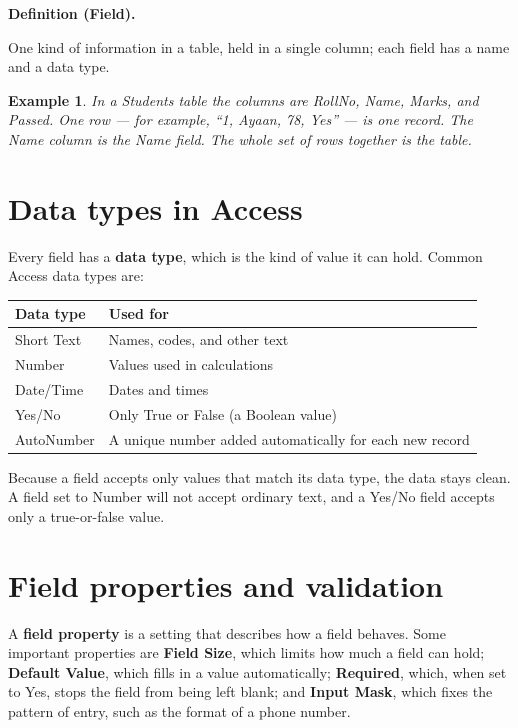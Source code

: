 \documentclass[11pt]{article}
\newtheorem{example}{Example}[section]
\newenvironment{definitionbox}[1]{%
  \par\noindent\textbf{Definition (#1).}\ \itshape
}{\par\vspace{0.3em}}
\begin{document}
\begin{definitionbox}{Field}
One kind of information in a table, held in a single column; each field has a
name and a data type.
\end{definitionbox}

\begin{example}
In a Students table the columns are RollNo, Name, Marks, and Passed. One row
--- for example, ``1, Ayaan, 78, Yes'' --- is one record. The Name column is
the Name field. The whole set of rows together is the table.
\end{example}

\section{Data types in Access}
Every field has a \textbf{data type}, which is the kind of value it can hold.
Common Access data types are:

\begin{center}
\begin{tabular}{p{}p{}}
\toprule
\textbf{Data type} & \textbf{Used for} \\
\midrule
Short Text & Names, codes, and other text \\
Number & Values used in calculations \\
Date/Time & Dates and times \\
Yes/No & Only True or False (a Boolean value) \\
AutoNumber & A unique number added automatically for each new record \\
\bottomrule
\end{tabular}
\end{center}

Because a field accepts only values that match its data type, the data stays
clean. A field set to Number will not accept ordinary text, and a Yes/No
field accepts only a true-or-false value.

\section{Field properties and validation}
A \textbf{field property} is a setting that describes how a field behaves.
Some important properties are \textbf{Field Size}, which limits how much a
field can hold; \textbf{Default Value}, which fills in a value
automatically; \textbf{Required}, which, when set to Yes, stops the field
from being left blank; and \textbf{Input Mask}, which fixes the pattern of
entry, such as the format of a phone number.
\end{document}
